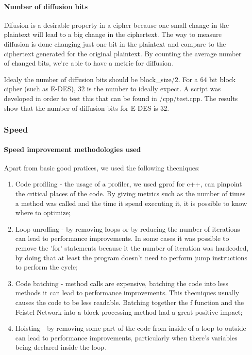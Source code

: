 \documentclass{article} %
\begin{document}
\paragraph{Number of diffusion bits}
Difusion is a desirable property in a cipher because one small change in the plaintext will lead to a big change in the ciphertext. 
The way to measure diffusion is done changing just one bit in the plaintext and compare to the ciphertext generated for the original plaintext. By counting the average number
of changed bits, we're able to have a metric for diffusion. 

Idealy the number of diffusion bits should be block\_size/2. For a 64 bit block cipher (such as E-DES), 32 is the number to ideally expect. A script was developed in order
to test this that can be found in /cpp/test.cpp. The results show that the number of diffusion bits for E-DES is 32.


\subsubsection{Speed}
\label{speedinp}
\paragraph{Speed improvement methodologies used}

Apart from basic good pratices, we used the following thecniques:
\begin{enumerate}
  \item Code profiling - the usage of a profiler, we used gprof for c++, can pinpoint the critical places of the code. By giving metrics such as the number of 
  times a method was called and the time it spend executing it, it is possible to know where to optimize;
  \item Loop unrolling - by removing loops or by reducing the number of iterations can lead to performance improvements. In some cases it was possible to remove the 'for'
  statements because it the number of iteration was hardcoded, by doing that at least the program doesn't need to perform jump instructions to perform the cycle;
  \item Code batching - method calls are expensive, batching the code into less methods it can lead to performance improvements. This thecniques usually causes the code 
  to be less readable. Batching together the f function and the Feistel Network into a block processing method had a great positive impact;
  \item Hoisting - by removing some part of the code from inside of a loop to outside can lead to performance improvements, particularly when there's variables being
  declared inside the loop.
\end{enumerate}
\end{document}
